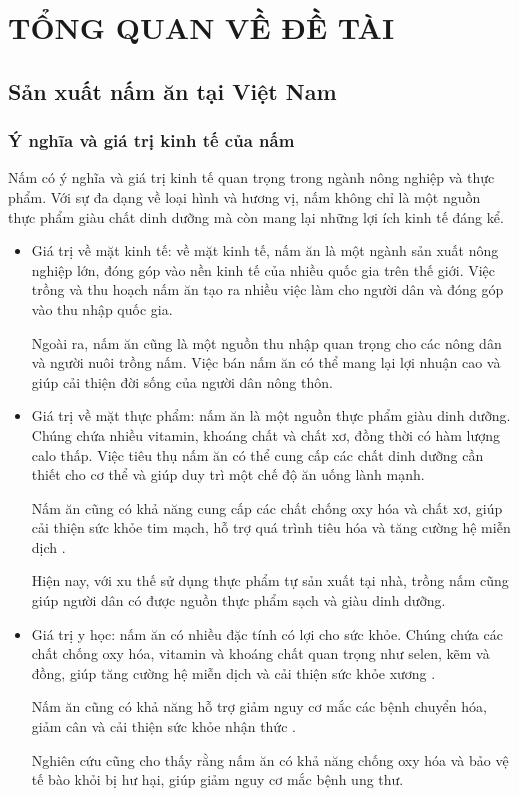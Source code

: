 

\chapter{TỔNG QUAN VỀ ĐỀ TÀI}

\section{Sản xuất nấm ăn tại Việt Nam}

\subsection{Ý nghĩa và giá trị kinh tế của nấm}

Nấm có ý nghĩa và giá trị kinh tế quan trọng trong ngành nông nghiệp và thực phẩm. Với sự đa dạng về loại hình và hương vị, nấm không chỉ là một nguồn thực phẩm giàu chất dinh dưỡng mà còn mang lại những lợi ích kinh tế đáng kể.
\begin{itemize}
	\item Giá trị về mặt kinh tế: về mặt kinh tế, nấm ăn là một ngành sản xuất nông nghiệp lớn, đóng góp vào nền kinh tế của nhiều quốc gia trên thế giới. Việc trồng và thu hoạch nấm ăn tạo ra nhiều việc làm cho người dân và đóng góp vào thu nhập quốc gia.
	
	Ngoài ra, nấm ăn cũng là một nguồn thu nhập quan trọng cho các nông dân và người nuôi trồng nấm. Việc bán nấm ăn có thể mang lại lợi nhuận cao và giúp cải thiện đời sống của người dân nông thôn.
	
	\item Giá trị về mặt thực phẩm: nấm ăn là một nguồn thực phẩm giàu dinh dưỡng. Chúng chứa nhiều vitamin, khoáng chất và chất xơ, đồng thời có hàm lượng calo thấp. Việc tiêu thụ nấm ăn có thể cung cấp các chất dinh dưỡng cần thiết cho cơ thể và giúp duy trì một chế độ ăn uống lành mạnh.
	
	Nấm ăn cũng có khả năng cung cấp các chất chống oxy hóa và chất xơ, giúp cải thiện sức khỏe tim mạch, hỗ trợ quá trình tiêu hóa và tăng cường hệ miễn dịch \cite{chau2022Apr}.
	
	Hiện nay, với xu thế sử dụng thực phẩm tự sản xuất tại nhà, trồng nấm cũng giúp người dân có được nguồn thực phẩm sạch và giàu dinh dưỡng.
	\item Giá trị y học: nấm ăn có nhiều đặc tính có lợi cho sức khỏe. Chúng chứa các chất chống oxy hóa, vitamin và khoáng chất quan trọng như selen, kẽm và đồng, giúp tăng cường hệ miễn dịch và cải thiện sức khỏe xương \cite{chau2022Apr}.
	
	Nấm ăn cũng có khả năng hỗ trợ giảm nguy cơ mắc các bệnh chuyển hóa, giảm cân và cải thiện sức khỏe nhận thức \cite{chau2022Apr}.
	
	Nghiên cứu cũng cho thấy rằng nấm ăn có khả năng chống oxy hóa và bảo vệ tế bào khỏi bị hư hại, giúp giảm nguy cơ mắc bệnh ung thư.
	
\end{itemize}

